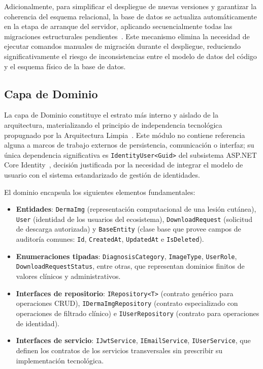 Adicionalmente, para simplificar el despliegue de nuevas versiones y garantizar la coherencia del 
esquema relacional, la base de datos se actualiza automáticamente en la etapa de arranque del servidor, 
aplicando secuencialmente todas las migraciones estructurales pendientes~\cite{ef_core_migrations}. Este 
mecanismo elimina la necesidad de ejecutar comandos manuales de migración durante el despliegue, 
reduciendo significativamente el riesgo de inconsistencias entre el modelo de datos del código y el 
esquema físico de la base de datos.

\subsection{Capa de Dominio}
La capa de Dominio constituye el estrato más interno y aislado de la arquitectura, materializando el 
principio de independencia tecnológica propugnado por la Arquitectura 
Limpia~\cite{martin_clean_architecture}. Este módulo no contiene referencia alguna a marcos de trabajo 
externos de persistencia, comunicación o interfaz; su única dependencia significativa es 
\texttt{IdentityUser<Guid>} del subsistema ASP.NET Core Identity~\cite{aspnet_identity}, decisión 
justificada por la necesidad de integrar el modelo de usuario con el sistema estandarizado de gestión 
de identidades.

El dominio encapsula los siguientes elementos fundamentales:

\begin{itemize}
    \item \textbf{Entidades}: \texttt{DermaImg} (representación computacional de una lesión cutánea), 
    \texttt{User} (identidad de los usuarios del ecosistema), \texttt{DownloadRequest} 
    (solicitud de descarga autorizada) y \texttt{BaseEntity} 
    (clase base que provee campos de auditoría comunes: \texttt{Id}, \texttt{CreatedAt}, 
    \texttt{UpdatedAt} e \texttt{IsDeleted}).
    \item \textbf{Enumeraciones tipadas}: \texttt{DiagnosisCategory}, \texttt{ImageType}, 
    \texttt{UserRole}, \texttt{DownloadRequestStatus}, entre otras, que representan dominios 
    finitos de valores clínicos y administrativos.
    \item \textbf{Interfaces de repositorio}: \texttt{IRepository<T>} 
    (contrato genérico para operaciones CRUD), \texttt{IDermaImgRepository} (contrato especializado 
    con operaciones de filtrado clínico) e \texttt{IUserRepository} (contrato para operaciones 
    de identidad).
    \item \textbf{Interfaces de servicio}: \texttt{IJwtService}, \texttt{IEmailService}, 
    \texttt{IUserService}, que definen los contratos de los servicios transversales sin prescribir su 
    implementación tecnológica.
\end{itemize}

